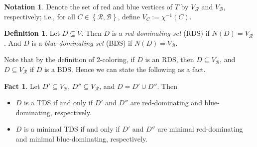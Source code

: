 \documentclass[12pt, reqno]{amsart}
\theoremstyle{definition}
\theoremstyle{plain}
\theoremstyle{definition}
\newtheorem{fact}[theorem]{Fact}
\newtheorem{notation}[theorem]{Notation}
\newtheorem{definition}[theorem]{Definition}
\newcommand{\R}{\mathcal{R}}
\newcommand{\B}{\mathcal{B}}
\newcommand\set[1]{\left\lbrace #1 \right\rbrace}
\begin{document}
\begin{notation}
    Denote the set of red and blue vertices of $T$ by $V_{\R}$ and $V_{\B}$, respectively; i.e., for all $C \in \set{\R,\B}$, define $V_C := \chi^{-1}(C)$.
\end{notation}
    
\begin{definition}
    Let $D \subseteq V$.
    Then $D$ is a \emph{red-dominating set} (RDS) if $N(D) = V_\R$. 
    And $D$ is a \emph{blue-dominating set} (BDS) if $N(D) = V_\B$.
\end{definition}

Note that by the definition of 2-coloring, if $D$ is an RDS, then $D \subseteq V_\B$, and $D \subseteq V_\R$ if $D$ is a BDS.
Hence we can state the following as a fact.

\begin{fact}\label{fact. TDS iff RDS U BDS}
    Let $D' \subseteq V_\B$, $D'' \subseteq V_\R$, and $D = D' \cup D''$. 
    Then
    \begin{itemize}
        \item[(1)] $D$ is a TDS if and only if $D'$ and $D''$ are red-dominating and blue-dominating, respectively.
        \item[(2)] $D$ is a minimal TDS if and only if $D'$ and $D''$ are minimal red-dominating and minimal blue-dominating, respectively.
    \end{itemize}
\end{fact}
\end{document}
